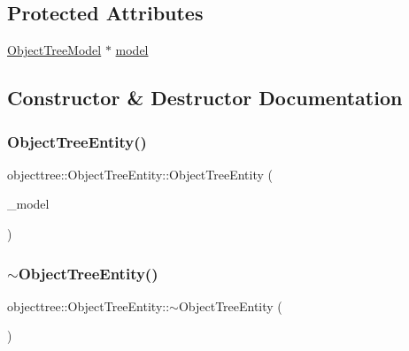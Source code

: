 \subsection*{Protected Attributes}
\begin{DoxyCompactItemize}
\item 
\mbox{\hyperlink{class_object_tree_model}{Object\+Tree\+Model}} $\ast$ \mbox{\hyperlink{classobjecttree_1_1_object_tree_entity_a14877a357cf06bc50beb2efbb3c07e40}{model}}
\end{DoxyCompactItemize}


\subsection{Constructor \& Destructor Documentation}
\mbox{\label{classobjecttree_1_1_object_tree_entity_ad9edcfc24467898f1f2ca1e2a056e9b7}} 
\subsubsection{\texorpdfstring{ObjectTreeEntity()}{ObjectTreeEntity()}}
{\footnotesize\ttfamily objecttree\+::\+Object\+Tree\+Entity\+::\+Object\+Tree\+Entity (\begin{DoxyParamCaption}\item[{\mbox{\hyperlink{class_object_tree_model}{Object\+Tree\+Model}} $\ast$}]{\+\_\+model }\end{DoxyParamCaption})}

\mbox{\label{classobjecttree_1_1_object_tree_entity_a75e8f60c430ead9cda0593c53d1cb82b}} 
\subsubsection{\texorpdfstring{$\sim$ObjectTreeEntity()}{~ObjectTreeEntity()}}
{\footnotesize\ttfamily objecttree\+::\+Object\+Tree\+Entity\+::$\sim$\+Object\+Tree\+Entity (\begin{DoxyParamCaption}{ }\end{DoxyParamCaption})\hspace{0.3cm}{\ttfamily [virtual]}}



